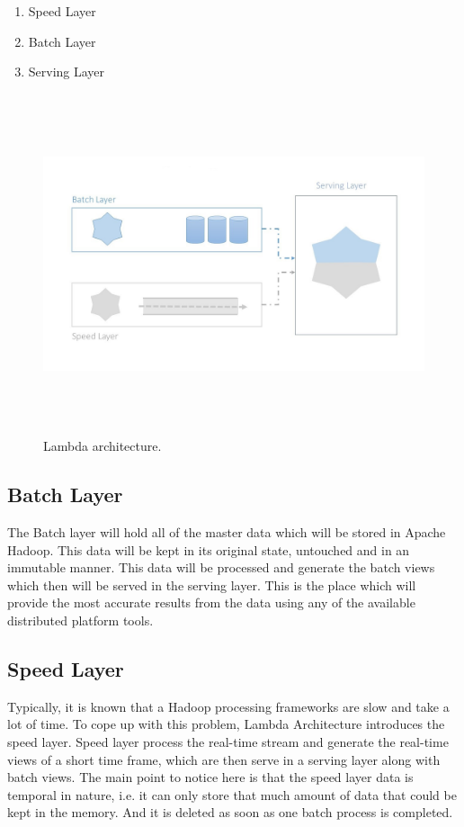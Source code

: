 \begin{enumerate}
	\item Speed Layer
	\item Batch Layer
	\item Serving Layer
	
\end{enumerate}


\begin{figure}[htpb]
	\centering
	\includegraphics[width=12cm,height=10cm,keepaspectratio=true]{images/lambda_arc}
	\caption{
		Lambda architecture.
	}
	\label{fig:lambda_arc}
\end{figure}



\subsection{Batch Layer}
The Batch layer will hold all of the master data which will be stored in Apache Hadoop. This data will be kept in its original state, untouched and in an immutable manner. This data will be processed and generate the batch views which then will be served in the serving layer. This is the place which will provide the most accurate results from the data using any of the available distributed platform tools.

\subsection{Speed Layer}
Typically, it is known that a Hadoop processing frameworks are slow and take a lot of time. To cope up with this problem, Lambda Architecture introduces the speed layer. Speed layer process the real-time stream and generate the real-time views of a short time frame, which are then serve in a serving layer along with batch views. The main point to notice here is that the speed layer data is temporal in nature, i.e. it can only store that much amount of data that could be kept in the memory. And it is deleted as soon as one batch process is completed.

